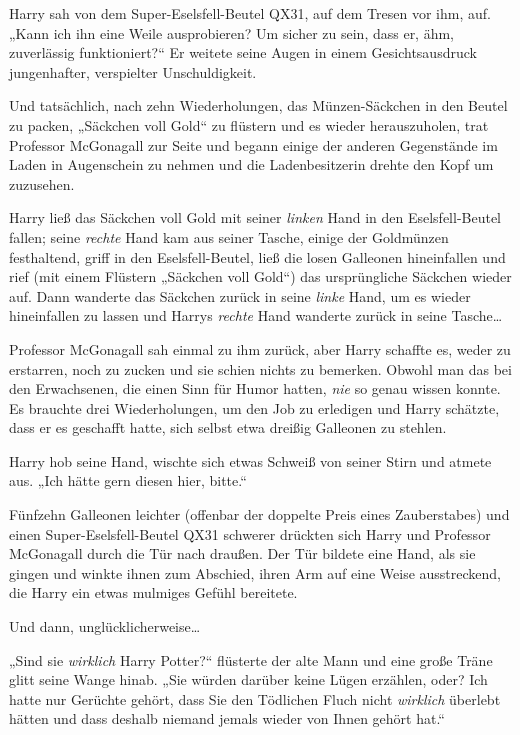 {Harry sah von dem Super-Eselsfell-Beutel QX31, auf dem Tresen vor ihm, auf. „Kann ich ihn eine Weile ausprobieren? Um sicher zu sein, dass er, ähm, zuverlässig funktioniert?“ Er weitete seine Augen in einem Gesichtsausdruck jungenhafter, verspielter Unschuldigkeit.

Und tatsächlich, nach zehn Wiederholungen, das Münzen-Säckchen in den Beutel zu packen, „Säckchen voll Gold“ zu flüstern und es wieder herauszuholen, trat Professor McGonagall zur Seite und begann einige der anderen Gegenstände im Laden in Augenschein zu nehmen und die Ladenbesitzerin drehte den Kopf um zuzusehen.

Harry ließ das Säckchen voll Gold mit seiner \emph{linken} Hand in den Eselsfell-Beutel fallen; seine \emph{rechte} Hand kam aus seiner Tasche, einige der Goldmünzen festhaltend, griff in den Eselsfell-Beutel, ließ die losen Galleonen hineinfallen und rief (mit einem Flüstern „Säckchen voll Gold“) das ursprüngliche Säckchen wieder auf. Dann wanderte das Säckchen zurück in seine \emph{linke} Hand, um es wieder hineinfallen zu lassen und Harrys \emph{rechte} Hand wanderte zurück in seine Tasche…

Professor McGonagall sah einmal zu ihm zurück, aber Harry schaffte es, weder zu erstarren, noch zu zucken und sie schien nichts zu bemerken. Obwohl man das bei den Erwachsenen, die einen Sinn für Humor hatten, \emph{nie} so genau wissen konnte. Es brauchte drei Wiederholungen, um den Job zu erledigen und Harry schätzte, dass er es geschafft hatte, sich selbst etwa dreißig Galleonen zu stehlen.

Harry hob seine Hand, wischte sich etwas Schweiß von seiner Stirn und atmete aus. „Ich hätte gern diesen hier, bitte.“

Fünfzehn Galleonen leichter (offenbar der doppelte Preis eines Zauberstabes) und einen Super-Eselsfell-Beutel QX31 schwerer drückten sich Harry und Professor McGonagall durch die Tür nach draußen. Der Tür bildete eine Hand, als sie gingen und winkte ihnen zum Abschied, ihren Arm auf eine Weise ausstreckend, die Harry ein etwas mulmiges Gefühl bereitete.

Und dann, unglücklicherweise…

„Sind sie \emph{wirklich} Harry Potter?“ flüsterte der alte Mann und eine große Träne glitt seine Wange hinab. „Sie würden darüber keine Lügen erzählen, oder? Ich hatte nur Gerüchte gehört, dass Sie den Tödlichen Fluch nicht \emph{wirklich} überlebt hätten und dass deshalb niemand jemals wieder von Ihnen gehört hat.“

}
